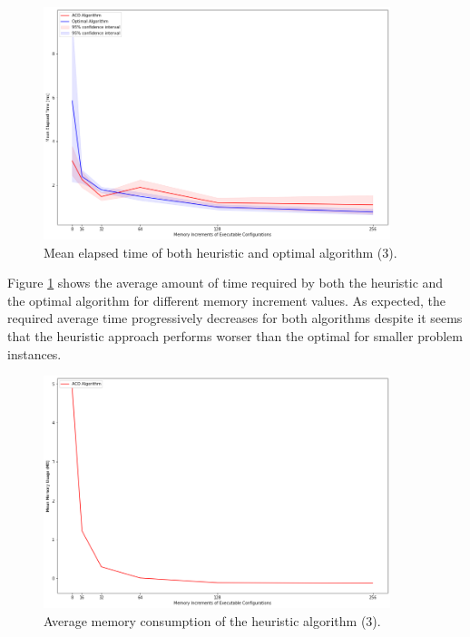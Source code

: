 \documentclass[12pt,a4paper]{report}
\begin{document}
\begin{figure}[h]
	\centering
	\includegraphics[width=0.9\textwidth]{./Images/ACOvsOptimalIncreasingMemoryIncrement.png}
	\caption{Mean elapsed time of both heuristic and optimal algorithm (3).}%
	\label{ACOvsOptimalIncreasingMemoryIncrement}
\end{figure}

Figure \ref{ACOvsOptimalIncreasingMemoryIncrement} shows the average amount of time required by both the heuristic and the optimal algorithm for different memory increment values. As expected, the required average time progressively decreases for both algorithms despite it seems that the heuristic approach performs worser than the optimal for smaller problem instances.

\begin{figure}[h]
	\centering
	\includegraphics[width=0.9\textwidth]{./Images/ACORamConsumptionIncreasingMemoryIncrement.png}
	\caption{Average memory consumption of the heuristic algorithm (3).}%
	\label{ACORamConsumptionIncreasingMemoryIncrement}
\end{figure}
\end{document}
